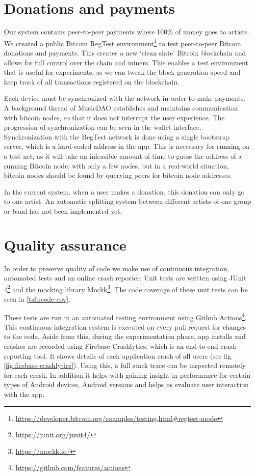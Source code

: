 \section{Donations and payments}
\label{sec:regtest-network-impl}
Our system contains peer-to-peer payments where 100\% of money goes to artists. We created a public Bitcoin RegTest environment\footnote{\url{https://developer.bitcoin.org/examples/testing.html\#regtest-mode}} to test peer-to-peer Bitcoin donations and payments. This creates a new `clean slate' Bitcoin blockchain and allows for full control over the chain and miners. This enables a test environment that is useful for experiments, as we can tweak the block generation speed and keep track of all transactions registered on the blockchain. 

Each device must be synchronized with the network in order to make payments. A background thread of MusicDAO establishes and maintains communication with bitcoin nodes, so that it does not interrupt the user experience. The progression of synchronization can be seen in the wallet interface. Synchronization with the RegTest network is done using a single bootstrap server, which is a hard-coded address in the app. This is necessary for running on a test net, as it will take an infeasible amount of time to guess the address of a running Bitcoin node, with only a few nodes. but in a real-world situation, bitcoin nodes should be found by querying peers for bitcoin node addresses.

In the current system, when a user makes a donation, this donation can only go to one artist. An automatic splitting system between different artists of one group or band has not been implemented yet.

\section{Quality assurance}
In order to preserve quality of code we make use of continuous integration, automated tests and an online crash reporter. Unit tests are written using JUnit 4\footnote{\url{https://junit.org/junit4/}} and the mocking library Mockk\footnote{\url{https://mockk.io/}}. The code coverage of these unit tests can be seen in \ref{tab:code-cov}.

These tests are run in an automated testing environment using Github Actions\footnote{\url{https://github.com/features/actions}}. This continuous integration system is executed on every pull request for changes to the code. Aside from this, during the experimentation phase, app installs and crashes are recorded using Firebase Crashlytics, which is an end-to-end crash reporting tool. It shows details of each application crash of all users (see fig. \ref{fig:firebase-crashlytics}). Using this, a full stack trace can be inspected remotely for each crash. In addition it helps with gaining insight in performance for certain types of Android devices, Android versions and helps us evaluate user interaction with the app. 

